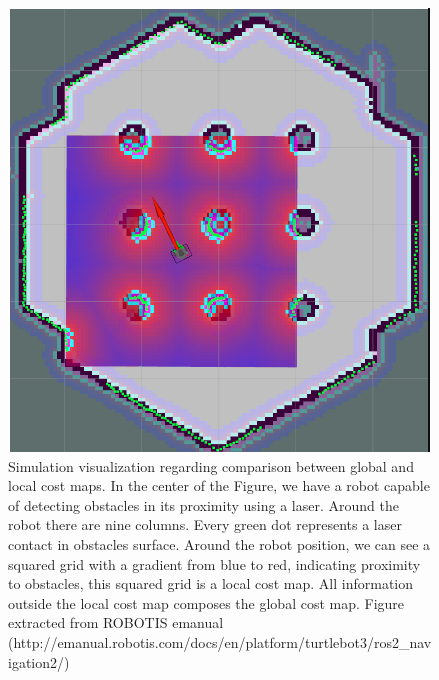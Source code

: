          \begin{figure}[H]
            \centering
            \includegraphics[scale=0.85]{figs/Chap4/costmaps_ros2.png}
            \caption{Simulation visualization regarding comparison between global and local cost maps. In the center of the Figure, we have a robot capable of detecting obstacles in its proximity using a laser. Around the robot there are nine columns. Every green dot represents a laser contact in obstacles surface. Around the robot position, we can see a squared grid with a gradient from blue to red, indicating proximity to obstacles, this squared grid is a local cost map. All information outside the local cost map composes the global cost map. Figure extracted from ROBOTIS emanual (http://emanual.robotis.com/docs/en/platform/turtlebot3/ros2\_navigation2/)}
            \label{fig:costmaps}
        \end{figure}
        
